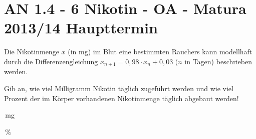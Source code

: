 \section{AN 1.4 - 6 Nikotin - OA - Matura 2013/14 Haupttermin}

\begin{beispiel}[AN 1.4]{1} %
				Die Nikotinmenge $x$ (in mg) im Blut eine bestimmten Rauchers kann modellhaft durch die Differenzengleichung $x_{n+1}=0,98\cdot x_n+0,03$ ($n$ in Tagen) beschrieben werden.
				
				Gib an, wie viel Milligramm Nikotin täglich zugeführt werden und wie viel Prozent der im Körper vorhandenen Nikotinmenge täglich abgebaut werden!
				
				\,mg
				
				\,\%
\end{beispiel}